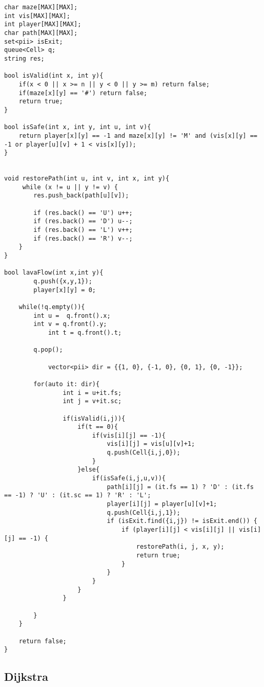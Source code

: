 \documentclass[10pt]{article}
\begin{document}
\begin{multicols*}{2}
\begin{lstlisting}[style=compactcpp]
char maze[MAX][MAX];
int vis[MAX][MAX];
int player[MAX][MAX];
char path[MAX][MAX];
set<pii> isExit;
queue<Cell> q;
string res;
 
bool isValid(int x, int y){
    if(x < 0 || x >= n || y < 0 || y >= m) return false;
    if(maze[x][y] == '#') return false;
    return true;
}

bool isSafe(int x, int y, int u, int v){
    return player[x][y] == -1 and maze[x][y] != 'M' and (vis[x][y] == -1 or player[u][v] + 1 < vis[x][y]);
}


void restorePath(int u, int v, int x, int y){
	 while (x != u || y != v) {
        res.push_back(path[u][v]);

        if (res.back() == 'U') u++;
        if (res.back() == 'D') u--;
        if (res.back() == 'L') v++;
        if (res.back() == 'R') v--;
    }
}
 
bool lavaFlow(int x,int y){
        q.push({x,y,1});
        player[x][y] = 0;

	while(!q.empty()){
		int u =  q.front().x;
		int v = q.front().y;
            int t = q.front().t;

		q.pop();

            vector<pii> dir = {{1, 0}, {-1, 0}, {0, 1}, {0, -1}};
     
    	for(auto it: dir){
                int i = u+it.fs;
                int j = v+it.sc;
    
                if(isValid(i,j)){
                    if(t == 0){
                        if(vis[i][j] == -1){
                            vis[i][j] = vis[u][v]+1;
                            q.push(Cell{i,j,0});
                        }
                    }else{
                        if(isSafe(i,j,u,v)){
                            path[i][j] = (it.fs == 1) ? 'D' : (it.fs == -1) ? 'U' : (it.sc == 1) ? 'R' : 'L';
                            player[i][j] = player[u][v]+1;
                            q.push(Cell{i,j,1});
                            if (isExit.find({i,j}) != isExit.end()) {
                                if (player[i][j] < vis[i][j] || vis[i][j] == -1) {
                                    restorePath(i, j, x, y);
                                    return true;
                                }
                            }
                        }
                    }
                }
    
        }
    }
 
    return false;
}
\end{lstlisting}

\subsection{Dijkstra}


\end{multicols*}
\end{document}
